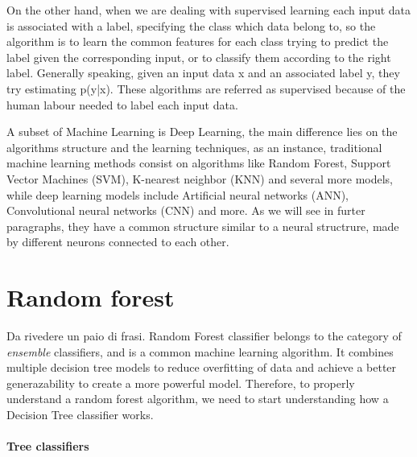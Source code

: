 \documentclass[11pt]{report}
\begin{document}
On the other hand, when we are dealing with supervised learning each input data is associated with a label, specifying the class which data belong to, so the algorithm is to learn the common features for each class trying to predict the label given the corresponding input, or to classify them according to the right label.
Generally speaking, given an input data x and an associated label y, they try estimating p(y|x). These algorithms are referred as supervised because of the human labour needed to label each input data.

A subset of Machine Learning is Deep Learning, the main difference lies on the algorithms structure and the learning techniques, as an instance, traditional machine learning methods consist on algorithms like Random Forest, Support Vector Machines (SVM), K-nearest neighbor (KNN) and several more models, while deep learning models include Artificial neural networks (ANN), Convolutional neural networks (CNN) and more.
As we will see in furter paragraphs, they have a common structure similar to a neural structrure, made by different neurons connected to each other.




\section{Random forest}
Da rivedere un paio di frasi.
Random Forest classifier belongs to the category of \emph{ensemble} classifiers, and is a common machine learning algorithm.
It combines multiple decision tree models to reduce overfitting of data and achieve a better generazability to create a more powerful model.
Therefore, to properly understand a random forest algorithm, we need to start understanding how a Decision Tree classifier works.

\paragraph{Tree classifiers} \hfill
\end{document}

